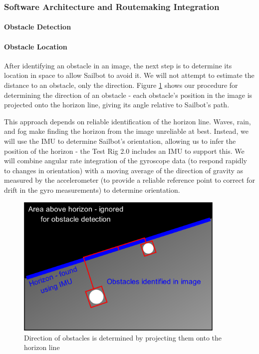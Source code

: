 \subsubsection{\label{sec:discussion:equipment:architecture}Software Architecture and Routemaking Integration}

\paragraph{\label{sec:discussion:equipment:architecture:obstacledetection}Obstacle Detection}

\paragraph{\label{sec:discussion:equipment:architecture:obstaclelocation}Obstacle Location}After identifying an obstacle in an image, the next step is to determine its location in space to allow Sailbot to avoid it.  We will not attempt to estimate the distance to an obstacle, only the direction.  Figure \ref{fig:horizon-finding} shows our procedure for determining the direction of an obstacle - each obstacle's position in the image is projected onto the horizon line, giving its angle relative to Sailbot's path.

This approach depends on reliable identification of the horizon line.  Waves, rain, and fog make finding the horizon from the image unreliable at best.  Instead, we will use the IMU to determine Sailbot's orientation, allowing us to infer the position of the horizon - the Test Rig 2.0 includes an IMU to support this.  We will combine angular rate integration of the gyroscope data (to respond rapidly to changes in orientation) with a moving average of the direction of gravity as measured by the accelerometer (to provide a reliable reference point to correct for drift in the gyro measurements) to determine orientation.

\begin{figure}
\includegraphics[width=100mm,natwidth=1203,natheight=627]{"./image/horizon_finding"}
\caption[UBC Sailbot.]{\label{fig:horizon-finding}Direction of obstacles is determined by projecting them onto the horizon line}
\end{figure}

